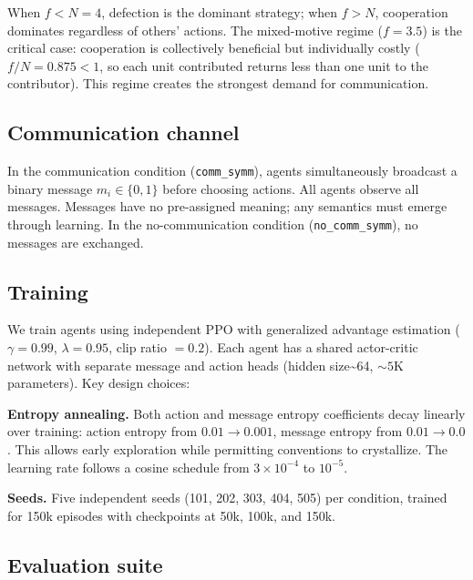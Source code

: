\documentclass[
  10pt,
  letterpaper,
]{article}
\begin{document}
When \(f < N = 4\), defection is the dominant strategy; when \(f > N\),
cooperation dominates regardless of others' actions. The mixed-motive
regime (\(f = 3.5\)) is the critical case: cooperation is collectively
beneficial but individually costly (\(f/N = 0.875 < 1\), so each unit
contributed returns less than one unit to the contributor). This regime
creates the strongest demand for communication.

\hypertarget{communication-channel}{%
\subsection{Communication channel}\label{communication-channel}}

In the communication condition (\texttt{comm\_symm}), agents
simultaneously broadcast a binary message \(m_i \in \{0, 1\}\) before
choosing actions. All agents observe all messages. Messages have no
pre-assigned meaning; any semantics must emerge through learning. In the
no-communication condition (\texttt{no\_comm\_symm}), no messages are
exchanged.

\hypertarget{training}{%
\subsection{Training}\label{training}}

We train agents using independent PPO \citep{schulman2017proximal} with
generalized advantage estimation \citep{schulman2016high}
(\(\gamma = 0.99\), \(\lambda = 0.95\), clip ratio \(= 0.2\)). Each
agent has a shared actor-critic network with separate message and action
heads (hidden size\textasciitilde64, \({\sim}5\)K parameters). Key
design choices:

\textbf{Entropy annealing.} Both action and message entropy coefficients
decay linearly over training: action entropy from \(0.01 \to 0.001\),
message entropy from \(0.01 \to 0.0\). This allows early exploration
while permitting conventions to crystallize. The learning rate follows a
cosine schedule from \(3 \times 10^{-4}\) to \(10^{-5}\).

\textbf{Seeds.} Five independent seeds (101, 202, 303, 404, 505) per
condition, trained for 150k episodes with checkpoints at 50k, 100k, and
150k.

\hypertarget{sec-eval}{%
\subsection{Evaluation suite}\label{sec-eval}}
\end{document}
